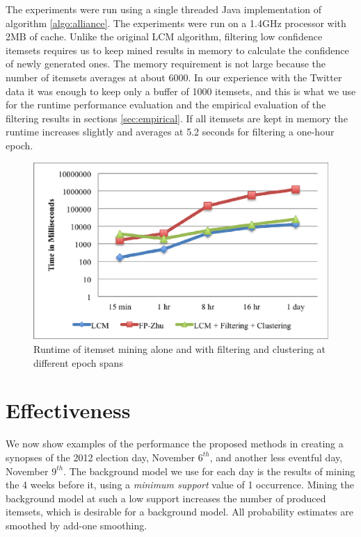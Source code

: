 \documentclass[letterpaper,12pt,titlepage,oneside,final]{book}
\begin{document}
The experiments were run using a single threaded Java implementation of
algorithm \ref{algo:alliance}.
The experiments were run on a 1.4GHz processor with 2MB of cache.
Unlike the original LCM algorithm, filtering low confidence itemsets requires
us to keep mined results in memory to calculate the confidence of newly
generated ones.
The memory requirement is not large because the number of itemsets averages
at about 6000.
In our experience with the Twitter data it was enough to keep only a buffer
of 1000 itemsets, and this is what we use for the runtime performance
evaluation and the empirical evaluation of the filtering results in
sections \ref{sec:empirical}.
If all itemsets are kept in memory the runtime increases slightly and
averages at 5.2 seconds for filtering a one-hour epoch.



\begin{figure}
\centering
\includegraphics{runtime_lcm-lcm+filter-fpzhu_seconds.eps}
\caption{Runtime of itemset mining alone and with filtering and clustering at different epoch spans}
\label{fig:lcmvsfpzhu}
\end{figure}

\section{Effectiveness}

We now show examples of the performance the proposed methods in creating
a synopses of the 2012 election day, November $6^{th}$, and another less
eventful day, November $9^{th}$.
The background model we use for each day is the results of mining the 4 weeks
before it, using a \emph{minimum support} value of 1 occurrence.
Mining the background model at such a low support increases the number of
produced itemsets, which is desirable for a background model.
All probability estimates are smoothed by add-one smoothing. 
\end{document}
